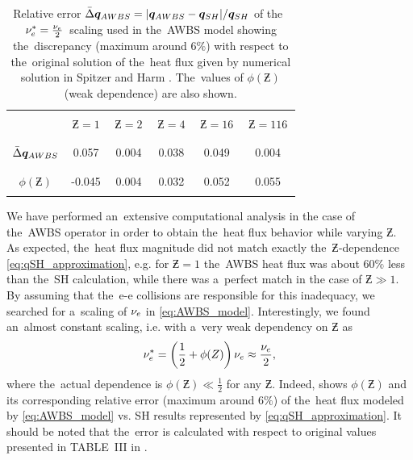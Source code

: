\begin{table}
\begin{center}
  \begin{tabular}{c|ccccc}
    \hline\hline\\
    & $\,\Zbar=1\,$ & $\,\Zbar=2\,$ & $\,\Zbar=4\,$ & $\,\Zbar=16\,$ & $\,\Zbar=116\,$ \\\\
    \hline\\
    $\bar{\Delta}\boldsymbol{q}_{AWBS}$ & 0.057 & 0.004 & 0.038 & 0.049 & 0.004 \\\\
    \hline\\
    $\phi(\Zbar)$ & -0.045 & 0.004 & 0.032 & 0.052 & 0.055 \\\\ 
    \hline\hline
  \end{tabular}
  \caption{
  Relative error $\bar{\Delta}\boldsymbol{q}_{AWBS} = 
  |\boldsymbol{q}_{AWBS} - \boldsymbol{q}_{SH}| / \boldsymbol{q}_{SH}$ of 
  the~$\nu_{e}^* = \frac{\nu_{e}}{2}$~scaling used in the~AWBS model
   showing the~discrepancy 
  (maximum around 6$\%$) with respect to the~original solution of 
  the~heat flux given by numerical solution in Spitzer and Harm 
  \cite{SpitzerHarm_PR1953}. The~values of $\phi(\Zbar)$ (weak dependence) are 
  also shown. 
  }
\label{tab:qAWBS}
\end{center}
\end{table}

We have performed an~extensive computational analysis in the case of 
the~AWBS operator in order to obtain the~heat flux behavior while varying 
$\Zbar$. As expected, the~heat flux magnitude did not match exactly 
the~$\Zbar$-dependence \eqref{eq:qSH_approximation}, e.g. for $\Zbar=1$
the~AWBS heat flux was about 60$\%$ less than the~SH calculation, while
there was a~perfect match in the case of $\Zbar\gg1$. By assuming that the~e-e
collisions are responsible for this inadequacy, we searched for a~scaling of
$\nu_{e}$ in \eqref{eq:AWBS_model}. Interestingly, we found an~almost constant
scaling, i.e. with a~very weak dependency on $\Zbar$ as  
\begin{equation}
  \nu_{e}^* = \left(\frac{1}{2} + \phi(Z)\right) \nu_{e} \approx \frac{\nu_{e}}{2} ,
  \label{eq:qAWBS_approximation}
\end{equation}
where the~actual dependence is $\phi(\Zbar)\ll\frac{1}{2}$ for any $\Zbar$.
Indeed,  shows $\phi(\Zbar)$ and its corresponding relative
error (maximum around 6$\%$) of the~heat flux modeled by 
\eqref{eq:AWBS_model} vs. SH results represented by 
\eqref{eq:qSH_approximation}. It should be noted that the~error is calculated 
with respect to original values presented in TABLE~III in 
\cite{SpitzerHarm_PR1953}.
 
